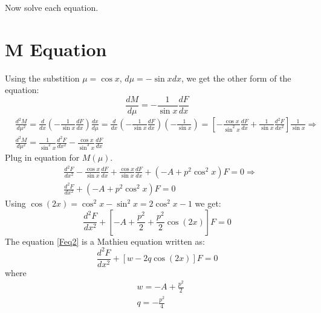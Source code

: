 Now solve each equation.

\section{M Equation}
Using the substition $ \mu = \cos x $, $ d\mu = -\sin x dx $,  we get the other form of the equation:
\begin{equation}
\frac{dM}{d\mu} = -\frac{1}{\sin x}\frac{d F}{d x}
\end{equation}
\begin{equation}
\begin{split}
& \frac{d^2M}{d\mu^2} = \frac{d}{d x}\left(-\frac{1}{\sin x}\frac{d F}{d x}\right)\frac{d x}{d \mu} = \frac{d}{d x}\left(-\frac{1}{\sin x}\frac{d F}{d x}\right)\left(-\frac{1}{\sin x}\right) = \left[-\frac{\cos x}{\sin^2 x}\frac{d F}{d x} + \frac{1}{\sin x}\frac{d^2 F}{d x^2}\right]\frac{1}{\sin x} \Rightarrow \\[.8em]
& \frac{d^2 M}{d\mu^2} = \frac{1}{\sin^2 x}\frac{d^2 F}{d x^2} - \frac{\cos x}{\sin^3 x}\frac{d F}{d x}
\end{split}
\end{equation}
Plug in equation for $ M(\mu) $.
\begin{equation}\label{Feq}
\begin{split}
& \frac{d^2 F}{d x^2} - \frac{\cos x}{\sin x}\frac{d F}{d x} + \frac{\cos x}{\sin x}\frac{d F}{d x} + \left(-A + p^2\cos^2 x\right) F = 0 \Rightarrow \\[.8em]
& \frac{d^2 F}{d x^2} + \left(-A + p^2\cos^2x\right)F = 0
\end{split}
\end{equation}
Using $ \cos(2x) = \cos^2x - \sin^2x = 2\cos^2x - 1 $ we get:
\begin{equation}\label{Feq2}
\frac{d^2 F}{d x^2} + \left[-A + \frac{p^2}{2} + \frac{p^2}{2}\cos(2x) \right]F = 0 
\end{equation}
The equation \eqref{Feq2} is a Mathieu equation written as:
\begin{equation}\label{FeqM }
\frac{d^2 F}{d x^2} + \left[w - 2q\cos(2x)\right]F = 0
\end{equation}
where
\begin{equation}
\begin{split}
& w = - A + \frac{p^2}{2} \\[.7em]
& q = - \frac{p^2}{4}
\end{split}
\end{equation}

